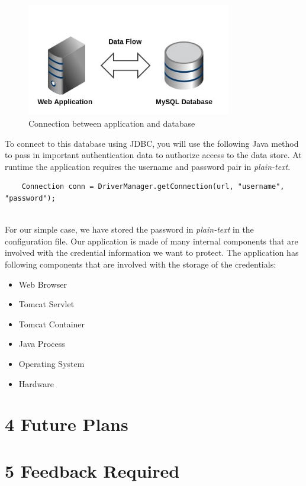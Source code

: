 \documentclass[11pt, a4paper, twoside, openright]{report}
\begin{document}
\begin{figure}[h!]
    \centering
    \includegraphics[width=0.8\textwidth]{external-overview.jpg}
    \caption{Connection between application and database}
\end{figure}

To connect to this database using JDBC, you will use the following Java method to pass in important authentication data to authorize access to the data store. At runtime the application requires the username and password pair in \emph{plain-text}. 

\begin{lstlisting}
	Connection conn = DriverManager.getConnection(url, "username", "password");
\end{lstlisting} \\


For our simple case, we have stored the password in \emph{plain-text} in the configuration file. Our application is made of many internal components that are involved with the credential  information we want to protect. The application has following components that are involved with the storage of the credentials:

\begin{itemize}
  \item Web Browser 
  \item Tomcat Servlet
  \item Tomcat Container 
  \item Java Process
  \item Operating System
  \item Hardware
\end{itemize}










\section*{4 Future Plans}





\section*{5 Feedback Required}






\backmatter

%


\end{document}
